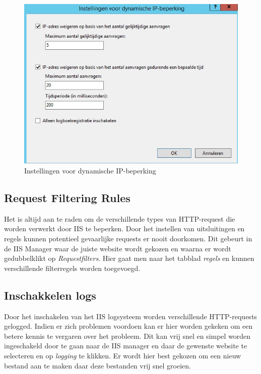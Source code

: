 \documentclass[pdftex,a4paper,12pt]{report}
\begin{document}
\begin{figure}[H]
\begin{center}
\includegraphics[scale=0.60]{img/IIS_Restrictie}
\end{center}
\label{img:IISRestrictie}
\caption{Instellingen voor dynamische IP-beperking}
\end{figure}

\subsection{Request Filtering Rules}
Het is altijd aan te raden om de verschillende types van HTTP-request die worden verwerkt door IIS te beperken. Door het instellen van uitsluitingen en regels kunnen potentieel gevaarlijke requests er nooit doorkomen. Dit gebeurt in de IIS Manager waar de juiste website wordt gekozen en waarna er wordt gedubbelklikt op \textit{Requestfilters}. Hier gaat men naar het tabblad \textit{regels} en kunnen verschillende filterregels worden toegevoegd.\citep{Darmanin2014} \citep{Microsoft2013}

\subsection{Inschakkelen logs}
Door het inschakelen van het IIS logsysteem worden verschillende HTTP-requests gelogged. Indien er zich problemen voordoen kan er hier worden gekeken om een betere kennis te vergaren over het probleem. Dit kan vrij snel en simpel worden ingeschakeld door te gaan naar de IIS manager en daar de gewenste website te selecteren en op \textit{logging} te klikken. Er wordt hier best gekozen om een nieuw bestand aan te maken daar deze bestanden vrij snel groeien. \citep{Darmanin2014} \citep{Microsoft2013}
\end{document}
